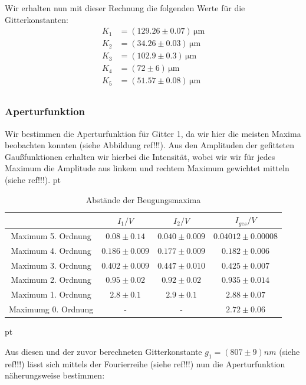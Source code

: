\documentclass[12pt]{article}
\begin{document}
Wir erhalten nun mit dieser Rechnung die folgenden Werte für die Gitterkonstanten:
\begin{align*}
	K_1&=(129.26\pm0.07)\,\mathrm{\mu m}\\
	K_2&=(34.26\pm0.03)\,\mathrm{\mu m}\\
	K_3&=(102.9\pm0.3)\,\mathrm{\mu m}\\
	K_4&=(72\pm6)\,\mathrm{\mu m}\\
	K_5&=(51.57\pm0.08)\,\mathrm{\mu m}\\
\end{align*}


\subsubsection{Aperturfunktion}


Wir bestimmen die Aperturfunktion für Gitter 1, da wir hier die meisten Maxima beobachten konnten (siehe Abbildung ref!!!).
Aus den Amplituden der gefitteten  Gaußfunktionen erhalten wir hierbei die Intensität, wobei wir wir für jedes Maximum die Amplitude aus linkem und rechtem Maximum gewichtet mitteln (siehe ref!!!). 
  pt
 \begin{table}[h!]
 {\centering
\begin{tabular}{c||c|c|c}
 					& $I_1/V$ 	& $I_2/V$ & $I_{ges}/V$	\\ \hline\hline
Maximum 5. Ordnung     & $0.08 \pm 0.14$  & $0.040 \pm 0.009$      &  $0.04012 \pm  0.00008$                       \\ \hline
Maximum 4. Ordnung		& $0.186 \pm 0.009$ 	&  $0.177 \pm 0.009$    	&  $0.182 \pm 0.006$ \\ \hline 
Maximum 3. Ordnung	&	 $0.402 \pm 0.009$ 	   	&  $0.447 \pm 0.010$  	&  $0.425 \pm 0.007$  \\ \hline
Maximum 2. Ordnung      	&  $0.95 \pm 0.02$  	&  $0.92 \pm 0.02$  &  $0.935 \pm 0.014$  \\ \hline
Maximum 1. Ordnung    & $2.8 \pm 0.1$ & $2.9 \pm 0.1$ &   $2.88 \pm 0.07$        \\ \hline                                           
Maximumg 0. Ordnung  & -  & - & $2.72 \pm 0.06$
 \end{tabular}
 \caption{Abstände der Beugungsmaxima}}
\end{table}
 pt


Aus diesen und der zuvor berechneten Gitterkonstante $g_1 = (807 \pm 9) nm$ (siehe ref!!!) lässt sich mittels der Fourierreihe (siehe ref!!!) nun die Aperturfunktion näherungsweise bestimmen:
\end{document}

